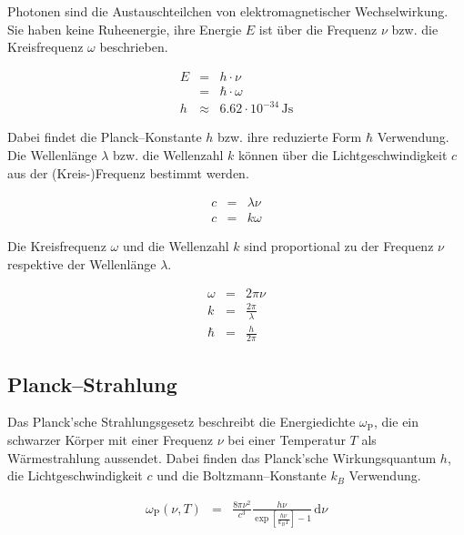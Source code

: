 \documentclass[12pt,a4paper]{scrartcl}
\numberwithin{equation}{section} %
\renewcommand{\[}{} %
\renewcommand{\]}{\noindent} %
\begin{document}
Photonen sind die Austauschteilchen von elektromagnetischer Wechselwirkung. Sie haben keine Ruheenergie, ihre Energie \(E\) ist über die Frequenz \(\nu\) bzw. die Kreisfrequenz \(\omega\) beschrieben. \cite{Fließbach}

\[
\begin{eqnarray}
    E &=& h\cdot \nu \\
        &=& \hbar \cdot \omega \\
    h &\approx& 6.62\cdot 10^{-34} \mathrm{\,Js}
    \end{eqnarray}
\]

\noindent
Dabei findet die Planck--Konstante \(h\) bzw. ihre reduzierte Form \(\hbar\) Verwendung. Die Wellenlänge \(\lambda\) bzw. die Wellenzahl \(k\) können über die Lichtgeschwindigkeit \(c\) aus der (Kreis-)Frequenz bestimmt werden.

\[
\begin{eqnarray}
    c &=& \lambda\nu \\
    c &=& k\omega
\end{eqnarray}
\]

\noindent
Die Kreisfrequenz \(\omega\) und die Wellenzahl \(k\) sind proportional zu der Frequenz \(\nu\) respektive der Wellenlänge \(\lambda\).

\[
\begin{eqnarray}
    \omega &=& 2\pi \nu \\
    k &=& \frac{2\pi}{\lambda} \\
    \hbar &=& \frac{h}{2\pi}
\end{eqnarray}
\]

\hypertarget{planckstrahlung}{%
\subsection{Planck--Strahlung}\label{planckstrahlung}}

Das Planck'sche Strahlungsgesetz beschreibt die Energiedichte \(\omega_\mathrm{P}\), die ein schwarzer Körper mit einer Frequenz \(\nu\) bei einer Temperatur \(T\) als Wärmestrahlung aussendet. Dabei finden das Planck'sche Wirkungsquantum \(h\), die Lichtgeschwindigkeit \(c\) und die Boltzmann--Konstante \(k_B\) Verwendung. \cite{Demtröder}

\[
\begin{eqnarray}
    \omega_\mathrm{P}(\nu,T) &=&
        \frac{8\pi\nu^2}{c^3}
        \frac{h\nu}{\exp\left[\frac{h\nu}{k_BT}\right]-1}
        \,\mathrm d\nu
        \label{eq:PlackStrahlung}
\end{eqnarray}
\]
\end{document}
